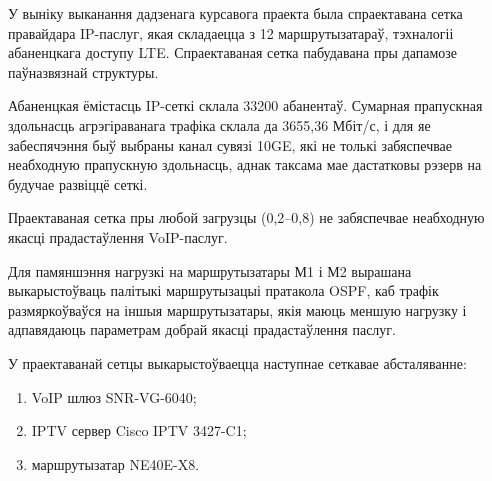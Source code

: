 
У выніку выканання дадзенага курсавога праекта была спраектавана
сетка правайдара IP-паслуг, якая складаецца з 12 маршрутызатараў,
тэхналогіі абаненцкага доступу LTE. Спраектаваная сетка пабудавана
пры дапамозе паўназвязнай структуры.

Абаненцкая ёмістасць IP-сеткі склала 33200 абанентаў.
Сумарная прапускная здольнасць агрэгіраванага трафіка склала да
3655,36 Мбіт/с, і для яе забеспячэння быў выбраны канал сувязі 10GE,
які не толькі забяспечвае неабходную прапускную здольнасць, аднак
таксама мае дастатковы рэзерв на будучае развіццё сеткі.

Праектаваная сетка пры любой загрузцы (0,2--0,8) не забяспечвае
неабходную якасці прадастаўлення VoIP-паслуг.

Для памяншэння нагрузкі на маршрутызатары М1 і М2 вырашана
выкарыстоўваць палітыкі маршрутызацыі пратакола OSPF, каб
трафік размяркоўваўся на іншыя маршрутызатары, якія
маюць меншую нагрузку і адпавядаюць параметрам добрай якасці
прадастаўлення паслуг.

У праектаванай сетцы выкарыстоўваецца наступнае сеткавае
абсталяванне:
\begin{enumerate}
    \item VoIP шлюз SNR-VG-6040;
    \item IPTV сервер Cisco IPTV 3427-C1;
    \item маршрутызатар NE40E-X8.
\end{enumerate}
